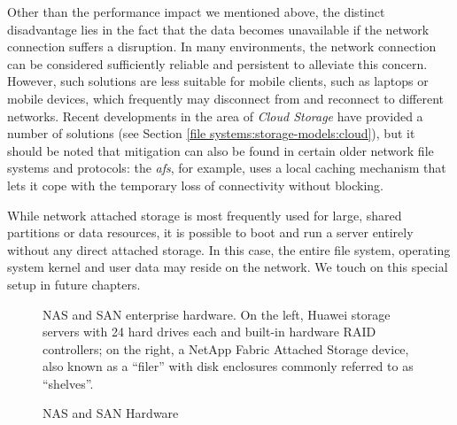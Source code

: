 Other than the performance impact we mentioned above,
the distinct disadvantage lies in the fact that the
data becomes unavailable if the network connection
suffers a disruption.  In many environments, the
network connection can be considered sufficiently
reliable and persistent to alleviate this concern.
However, such solutions are less suitable for mobile
clients, such as laptops or mobile devices, which
frequently may disconnect from and reconnect to
different networks.  Recent developments in the area
of {\em Cloud Storage} have
provided a number of solutions (see Section \ref{file
systems:storage-models:cloud}), but it should be noted
that mitigation can also be found in certain older
network file systems and protocols: the {\em
\gls{afs}}, for example, uses a local
caching mechanism that lets it cope with the temporary
loss of connectivity without blocking.

While network attached storage is most frequently used
for large, shared partitions or data resources, it is
possible to boot and run a server entirely without any
direct attached storage.  In this case, the entire
file system, operating system kernel and user data
may reside on the network.  We touch on this special
setup in future chapters.

\begin{figure}[!h]
	\hspace{5em}
	\caption{NAS and SAN Hardware}{NAS and SAN enterprise hardware.  On the left,
		Huawei storage servers with 24 hard
		drives each and built-in hardware RAID
		controllers; on the right, a NetApp
		Fabric Attached Storage device, also
		known as a ``filer'' with disk
		enclosures commonly referred to as ``shelves''.}
\end{figure}


